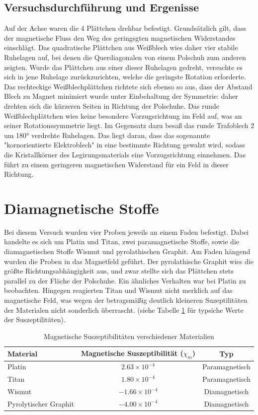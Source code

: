 \documentclass[a4paper,twoside,12pt,DIV=13,BCOR=5mm,numbers=noenddot,cleardoublepage=empty]{scrbook}
\begin{document}
\subsection{Versuchsdurchführung und Ergenisse}
\noindent Auf der Achse waren die 4 Plättchen drehbar befestigt. Grundsätzlich gilt, dass der magnetische Fluss den Weg des geringsgten magnetischen Widerstandes einschlägt. Das quadratische Plättchen aus Weißblech wies daher vier stabile Ruhelagen auf, bei denen die Querdiagonalen von einem Polschuh zum anderen zeigten. Wurde das Plättchen aus einer dieser Ruhelagen gedreht, versuchte es sich in jene Ruhelage zurückzurichten, welche die geringste Rotation erforderte. Das rechteckige Weißblechplättchen richtete sich ebenso so aus, dass der Abstand Blech zu Magnet minimiert wurde unter Einbehaltung der Symmetrie: daher drehten sich die kürzeren Seiten in Richtung der Polschuhe. Das runde Weißblechplättchen wies keine besondere Vorzugsrichtung im Feld auf, was an seiner Rotationssymmetrie liegt. Im Gegensatz dazu besaß das runde Trafoblech 2 um 180° verdrehte Ruhelagen. Das liegt daran, dass das sogenannte "kornorientierte Elektroblech" in eine bestimmte Richtung gewalzt wird, sodass die Kristallkörner des Legirungsmaterials eine Vorzugsrichtung einnehmen. Das führt zu einem geringeren magnetischen Widerstand für ein Feld in dieser Richtung.
\section{Diamagnetische Stoffe}
Bei diesem Versuch wurden vier Proben jeweils an einem Faden befestigt. Dabei handelte es sich um Platin und Titan, zwei paramagnetische Stoffe, sowie die diamagnetischen Stoffe Wismut und pyrolathischen Graphit. Am Faden hängend wurden die Proben in das Magnetfeld geführt. Der pyrolathische Graphit wies die größte Richtungsabhängigkeit aus, und zwar stellte sich das Plättchen stets parallel zu der Fläche der Polschuhe. Ein ähnliches Verhalten war bei Platin zu beobachten. Hingegen reagierten Titan und Wismut nicht merklich auf das magnetische Feld, was wegen der betragsmäßig deutlich kleineren Suzeptilitäten der Materialen nicht sonderlich überrascht. (siehe Tabelle \ref{tab: sus} für typsiche Werte der Suszeptilitäten).

\begin{table}[h]
    \centering
    \begin{tabular}{@{}lcc@{}}
    \toprule
    Material & Magnetische Suszeptibilität (\(\chi_m\)) & Typ \\
    \midrule
    Platin & \(2.63 \times 10^{-4}\) & Paramagnetisch \\
    Titan  & \(1.80 \times 10^{-4}\) & Paramagnetisch \\
    Wismut & \(-1.66 \times 10^{-4}\) & Diamagnetisch \\
    Pyrolytischer Graphit & \(-4.00 \times 10^{-4}\) & Diamagnetisch \\
    \bottomrule
    \end{tabular}
    \caption{Magnetische Suszeptibilitäten verschiedener Materialien}
    \label{tab: sus}
\end{table}
\end{document}
